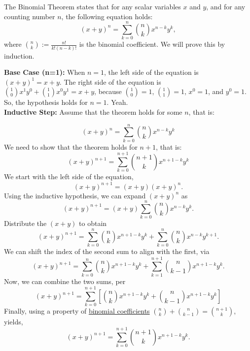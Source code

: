 \begin{tcolorbox}[title=\textcolor{black}{Proof of Theorem~\ref{thm:binomialTheoremGeneralN} (Binomial Theorem)}, sharp corners, colback=green!30, colframe=green!80!blue, breakable, fonttitle=\bfseries]
The Binomial Theorem states that for any scalar variables $x$ and $y$, and for any counting number $n$, the following equation holds:
$$
(x + y)^n = \sum_{k=0}^{n} \binom{n}{k} x^{n-k} y^k,$$
where $\binom{n}{k}:=\frac{n!}{k!(n-k)!}$ is the binomial coefficient.
We will prove this by induction.\\
\end{tcolorbox}


\textbf{Base Case (n=1):} When $n=1$, the left side of the equation is $(x+y)^1 = x+y$. The right side of the equation is $\binom{1}{0} x^1 y^0 + \binom{1}{1} x^0 y^1= x + y$, because $\binom{1}{0}=1$, $\binom{1}{1}=1$, $x^0 = 1$, and $y^0=1$. So, the hypothesis holds for $n=1$. Yeah.\\

\textbf{Inductive Step:} Assume that the theorem holds for some $n$, that is:

$$
(x + y)^n = \sum_{k=0}^{n} \binom{n}{k} x^{n-k} y^k
$$
We need to show that the theorem holds for $n+1$, that is:
$$
(x + y)^{n+1} = \sum_{k=0}^{n+1} \binom{n+1}{k} x^{n+1-k} y^k
$$
We start with the left side of the equation,
$$
(x + y)^{n+1} = (x + y)(x + y)^n.
$$
Using the inductive hypothesis, we can expand $(x + y)^n$ as
$$
(x + y)^{n+1} = (x + y)\sum_{k=0}^{n} \binom{n}{k} x^{n-k} y^k.
$$
Distribute the $(x+y)$ to obtain
$$
(x + y)^{n+1} = \sum_{k=0}^{n} \binom{n}{k} x^{n+1-k} y^k + \sum_{k=0}^{n} \binom{n}{k} x^{n-k} y^{k+1}.
$$
We can shift the index of the second sum to align with the first, via
$$
(x + y)^{n+1} = \sum_{k=0}^{n} \binom{n}{k} x^{n+1-k} y^k + \sum_{k=1}^{n+1} \binom{n}{k-1} x^{n+1-k} y^k.
$$
Now, we can combine the two sums, per
$$
(x + y)^{n+1} = \sum_{k=0}^{n+1} \left[ \binom{n}{k} x^{n+1-k} y^k + \binom{n}{k-1} x^{n+1-k} y^k \right]
$$
Finally, using a property of \href{https://en.wikipedia.org/wiki/Binomial_coefficient#:~:text=k%2Dcombinations.-,Recursive%20formula,-%5Bedit%5D}{binomial coefficients} $\binom{n}{k} + \binom{n}{k-1} = \binom{n+1}{k}$, yields,
$$
(x + y)^{n+1} = \sum_{k=0}^{n+1} \binom{n+1}{k} x^{n+1-k} y^k.
$$
\Qed

